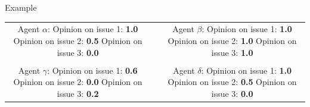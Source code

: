 \documentclass[12pt]{beamer}
\begin{document}
\begin{frame}[c]{Example} %

\begin{center}
\begin{tabular}{cp{1cm}c}
\makecell{
\small Agent $\alpha$: \\
\footnotesize Opinion on issue 1: \textbf{1.0} \\
\footnotesize Opinion on issue 2: \textbf{0.5} \\
\footnotesize Opinion on issue 3: \textbf{0.0} \\
} & &
\makecell{
\small Agent $\beta$: \\
\footnotesize Opinion on issue 1: \textbf{1.0} \\
\footnotesize Opinion on issue 2: \textbf{1.0} \\
\footnotesize Opinion on issue 3: \textbf{1.0} \\
} \\
\smallskip \\
\makecell{
\small Agent $\gamma$: \\
\footnotesize Opinion on issue 1: \textbf{0.6} \\
\footnotesize Opinion on issue 2: \textbf{0.0} \\
\footnotesize Opinion on issue 3: \textbf{0.2} \\
} & &
\makecell{
\small Agent $\delta$: \\
\footnotesize Opinion on issue 1: \textbf{1.0} \\
\footnotesize Opinion on issue 2: \textbf{0.5} \\
\footnotesize Opinion on issue 3: \textbf{0.0} \\
} \\
\end{tabular}

\bigskip
\bigskip
\smallskip
{}
\end{center}
\end{frame}
\end{document}
